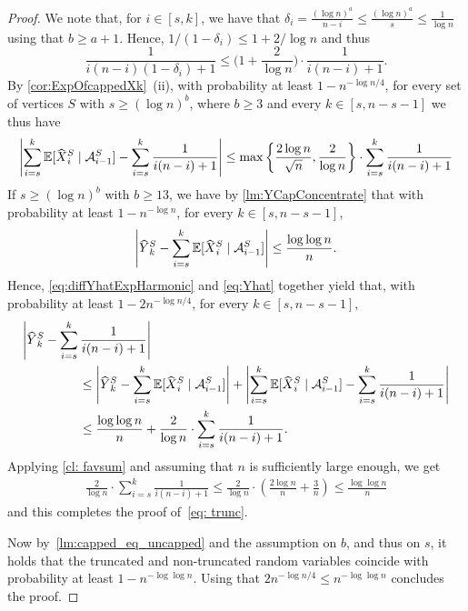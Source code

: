 \documentclass[a4paper,11pt]{article}
\theoremstyle{definition}
\theoremstyle{plain}
\newcommand{\A}{\mathcal A}
\newcommand{\expect}{\mathbb{E}}
\newcommand{\capped}[1]{\hstretch{2}{\hat{\hstretch{.5}{#1}}}}
\begin{document}
\begin{proof}
  We note that, for $i\in [s, k]$, we have that $\delta_i = \frac{(\log n)^a}{n - i} \le \frac{(\log n)^a}{s} \le \frac{1}{\log n}$ using that $b\ge a + 1$. Hence,
  $1/(1-\delta_i) \le  1 + 2/\log n$ and thus
  \[
    \frac{1}{i(n-i)(1-\delta_i) + 1}
    \le \Big(1 + \frac{2}{\log n}\Big) \cdot \frac{1}{i(n-i)+ 1}.
  \]
  By \cref{cor:ExpOfcappedXk}~(ii), with probability at least $1-n^{-\log n/4}$,
  for every set of vertices $S$ with $ s\ge (\log n)^{b}$, where $b\ge 3$ and every $k\in[s, n -  s - 1]$ we thus have
  \begin{equation}\label{eq:diffYhatExpHarmonic}
    \left|\sum_{i= s}^k \expect[\capped{X}^S_i \mid \A^S_{i-1}] - \sum_{i= s}^k \frac{1}{i(n-i) + 1} \right|
    \le \max
      \left\{
        \frac{2\log n}{\sqrt{n}}, \frac{2}{\log n}
      \right\}
    \cdot \sum_{i= s}^k \frac{1}{i(n-i) + 1}
  \end{equation}
  If $s\ge (\log n)^b$ with $b\ge 13$, we have by \cref{lm:YCapConcentrate} that with probability at least $1 - n^{-\log n}$,
  for every $k\in [ s, n- s-1]$,
  \begin{equation}\label{eq:Yhat}
      \left|\capped{Y}^S_k - \sum_{i= s}^k \expect[\capped{X}^S_i \mid \A^S_{i-1}] \right|
      \leq \frac{\log\log n}{n}.
  \end{equation}
  Hence, \eqref{eq:diffYhatExpHarmonic} and \eqref{eq:Yhat} together yield that, with probability at least $1 - 2n^{-\log n/4}$, for every $k\in [ s, n- s-1]$,
  \begin{align*}
          \left| \capped{Y}_k^{S} -  \sum_{i=s}^k \frac{1}{i(n-i) + 1} \right| 
          \hskip-2cm&
          \\&\le \left|\capped{Y}^S_k - \sum_{i= s}^k \expect[\capped{X}^S_i \mid \A^S_{i-1}] \right|
      + \left|\sum_{i= s}^k \expect[\capped{X}^S_i \mid \A^S_{i-1}] - \sum_{i= s}^k \frac{1}{i(n-i) + 1} \right|
    \\&\le
    \frac{\log\log n}{n} + \frac{2}{\log n} \cdot \sum_{i= s}^k \frac{1}{i(n-i) + 1}.
  \end{align*}
  Applying \cref{cl: favsum} and assuming that $n$ is sufficiently large enough, we get
  \begin{align*}
    \frac{2}{\log n} \cdot \sum_{i= s}^k \frac{1}{i(n-i) + 1}
    \leq
    \frac{2}{\log n} \cdot
    \left(
      \frac{2 \log n}{n} + \frac{3}{n}
    \right)
     \leq\frac{\log\log n}{n}
  \end{align*}
  and this completes the proof of~\eqref{eq: trunc}.

  Now by~\cref{lm:capped_eq_uncapped} and the assumption on $b$, and thus on $s$, it holds that the truncated and non-truncated random variables coincide with probability at least $1-n^{-\log \log n}$. Using that $2n^{-\log n/4}\le n^{-\log\log n}$ concludes the proof.
\end{proof}
\end{document}
